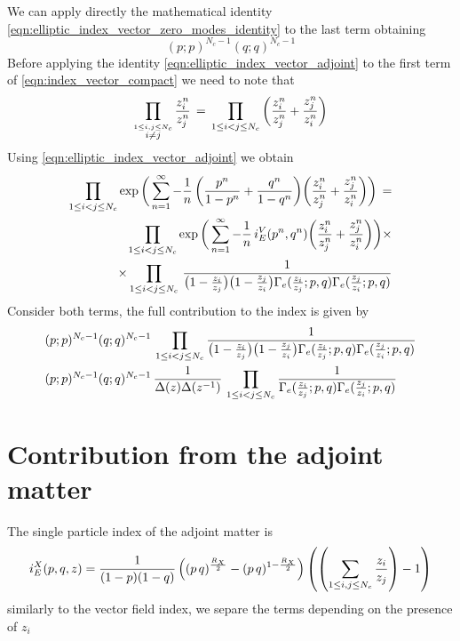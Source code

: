 \begin{appendices}
\begin{equation}
\label{eqn:index_vector_compact}
\end{equation}
We can apply directly the mathematical identity \eqref{eqn:elliptic_index_vector_zero_modes_identity} to the last term obtaining
$$
	(p;p)^{N_c-1} ( q;q)^{N_c-1}
$$
Before applying the identity \eqref{eqn:elliptic_index_vector_adjoint} to the first term of  \eqref{eqn:index_vector_compact} we need to note that 
$$
 \prod_{ \overset{ 1 \leq i,j \leq N_c}{ i\neq j }} {z_i^n \over z_j^n} \,  = \,
  \prod_{ 1 \leq i < j \leq N_c}\bigg( {z_i^n \over z_j^n} + {z_j^n \over z_i^n}   \bigg)
 $$
Using \eqref{eqn:elliptic_index_vector_adjoint} we obtain
\begin{align*}
\prod_{ 1 \leq i < j \leq N_c} \exp \bigg( \sum_{n=1}^{\infty} - {1 \over n} \, \bigg( {p^n \over 1-p^n} + {q^n \over 1-q^n} \bigg)  \bigg( {z_i^n \over z_j^n} + {z_j^n \over z_i^n}\bigg) \bigg) \, =\\
\prod_{ 1 \leq i < j \leq N_c} \exp \bigg( \sum_{n=1}^{\infty} - {1 \over n} \, i_E^V(p^n,q^n)  \bigg( {z_i^n \over z_j^n} + {z_j^n \over z_i^n}\bigg) \bigg) \times
\\
\times  \prod_{ 1 \leq i < j \leq N_c}   \, \frac{ 1 } { \big( 1 -{ z_i \over z_j} \big) \big ( 1 - { z_j \over z_i} \big) \Gamma_e( {z_i \over z_j};p,q) \Gamma_e({z_j \over z_i}; p,q)  }
\end{align*}
Consider both terms, the full contribution to the index is given by  \begin{align*}
& (p;p)^{N_c-1} ( q;q)^{N_c-1} \, \prod_{ 1 \leq i < j \leq N_c} \frac{ 1 }{ \big( 1 -{ z_i \over z_j} \big) \big ( 1 - { z_j \over z_i} \big) \Gamma_e( {z_i \over z_j};p,q) \Gamma_e({z_j \over z_i}; p,q)  } \\
& (p;p)^{N_c-1} ( q;q)^{N_c-1} \, \frac{1}{ \Delta(z) \Delta (z^{-1})} \, \prod_{ 1 \leq i < j \leq N_c} \frac{ 1 }{ \Gamma_e( {z_i \over z_j};p,q) \Gamma_e({z_j \over z_i}; p,q)}
\end{align*}




\section{Contribution from the adjoint matter}
The single particle index of the adjoint matter is
\begin{equation}
	i_E^{X}(p,q,z) = {1 \over (1-p)(1-q)}
	\left((p\,q)^{\frac{R_X}{2}}- (p\,q)^{1-\frac{R_X}{2}}\right) \left( \left(  \sum_{ 1 \leq i,j \leq N_c}  {z_i\over z_j}  \right)- 1 \right)
\end{equation}
similarly to the vector field index, we separe the terms depending on the presence of $z_i$


\end{appendices}
